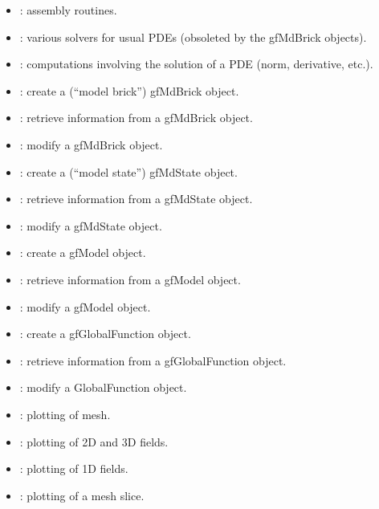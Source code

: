 \documentclass[a4paper,11pt,english]{sphinxmanual}
\begin{document}
\begin{itemize}
\item {} 
 : assembly routines.

\item {} 
 : various solvers for usual PDEs (obsoleted by the gfMdBrick
objects).

\item {} 
 : computations involving the solution of a PDE (norm,
derivative, etc.).

\item {} 
 : create a (“model brick”) gfMdBrick object.

\item {} 
 : retrieve information from a gfMdBrick object.

\item {} 
 : modify a gfMdBrick object.

\item {} 
 : create a (“model state”) gfMdState object.

\item {} 
 : retrieve information from a gfMdState object.

\item {} 
 : modify a gfMdState object.

\item {} 
 : create a gfModel object.

\item {} 
 : retrieve information from a gfModel object.

\item {} 
 : modify a gfModel object.

\item {} 
 : create a gfGlobalFunction object.

\item {} 
 : retrieve information from a gfGlobalFunction object.

\item {} 
 : modify a GlobalFunction object.

\item {} 
 : plotting of mesh.

\item {} 
 : plotting of 2D and 3D fields.

\item {} 
 : plotting of 1D fields.

\item {} 
 : plotting of a mesh slice.

\end{itemize}
\end{document}
